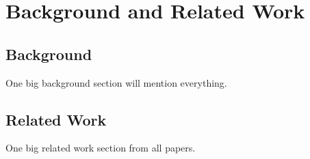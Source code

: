 \chapter{Background and Related Work}

\section{Background}
One big background section will mention everything.

\section{Related Work}
One big related work section from all papers.